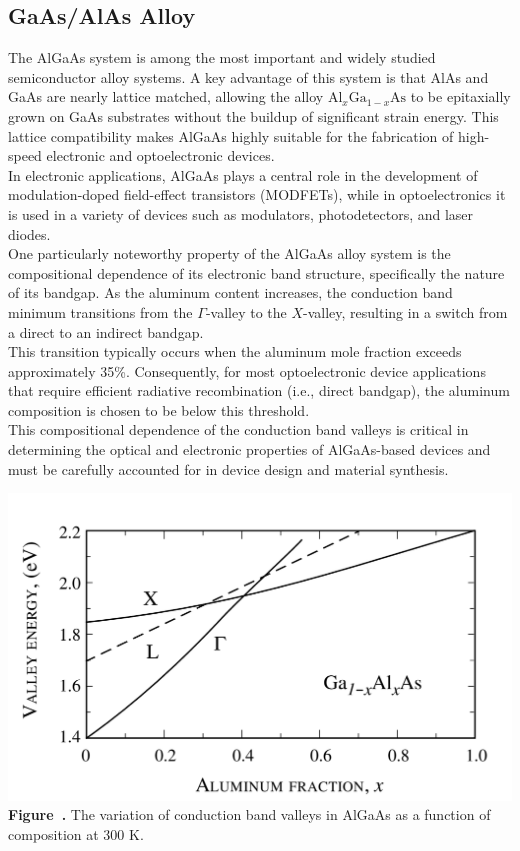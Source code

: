 \subsection{GaAs/AlAs Alloy}
The AlGaAs system is among the most important and widely studied semiconductor alloy systems. A key advantage of this system is that AlAs and GaAs are nearly lattice matched, allowing the alloy \( \text{Al}_x\text{Ga}_{1-x}\text{As} \) to be epitaxially grown on GaAs substrates without the buildup of significant strain energy. This lattice compatibility makes AlGaAs highly suitable for the fabrication of high-speed electronic and optoelectronic devices.\\
In electronic applications, AlGaAs plays a central role in the development of modulation-doped field-effect transistors (MODFETs), while in optoelectronics it is used in a variety of devices such as modulators, photodetectors, and laser diodes.\\
One particularly noteworthy property of the AlGaAs alloy system is the compositional dependence of its electronic band structure, specifically the nature of its bandgap. As the aluminum content increases, the conduction band minimum transitions from the \(\Gamma\)-valley to the \(X\)-valley, resulting in a switch from a direct to an indirect bandgap.\\
This transition typically occurs when the aluminum mole fraction exceeds approximately 35\%. Consequently, for most optoelectronic device applications that require efficient radiative recombination (i.e., direct bandgap), the aluminum composition is chosen to be below this threshold.\\
This compositional dependence of the conduction band valleys is critical in determining the optical and electronic properties of AlGaAs-based devices and must be carefully accounted for in device design and material synthesis.
\begin{center}
	\begin{minipage}{0.7\textwidth}
		\centering
		\includegraphics[width=\textwidth]{img/AlGaAs.png}
		\\[0.5em]
		\textbf{Figure~\thefigure.} The variation of conduction band valleys in AlGaAs as a function of composition at 300 K.
		\label{fig:AlGaAs}
	\end{minipage}
\end{center}

